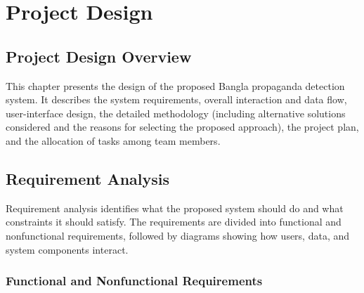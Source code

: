 \chapter{Project Design}
\label{ch:design}

\section{Project Design Overview}
This chapter presents the design of the proposed Bangla propaganda detection
system. It describes the system requirements, overall interaction and data flow,
user-interface design, the detailed methodology (including alternative solutions
considered and the reasons for selecting the proposed approach), the project plan,
and the allocation of tasks among team members.

\section{Requirement Analysis}
Requirement analysis identifies what the proposed system should do and what
constraints it should satisfy. The requirements are divided into functional and
nonfunctional requirements, followed by diagrams showing how users, data, and
system components interact.

\subsection{Functional and Nonfunctional Requirements}

